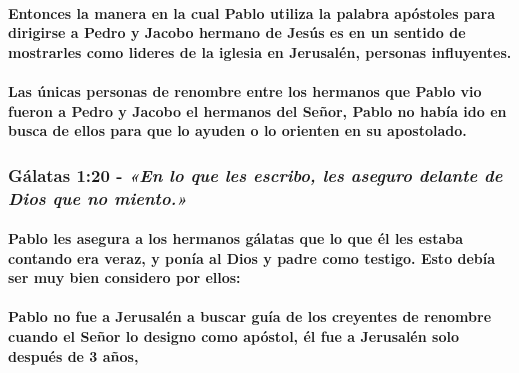 \documentclass[11a pt,twoside]{article}
\newcommand{\scripture}[1]{%
  {\fontsize{12pt}{16pt}\selectfont\ScriptureFont\itshape #1}%
}
\let\oldsubsubsection\subsubsection
\renewcommand{\subsubsection}{\needspace{4\baselineskip}\oldsubsubsection}
\let\oldparagraph\paragraph
\renewcommand{\paragraph}{\needspace{3\baselineskip}\oldparagraph}
\begin{document}
\paragraph{Entonces la manera en la cual Pablo utiliza la palabra
apóstoles para dirigirse a Pedro y Jacobo hermano de Jesús es en un
sentido de mostrarles como lideres de la iglesia en Jerusalén, personas
influyentes.}\label{entonces-la-manera-en-la-cual-pablo-utiliza-la-palabra-apuxf3stoles-para-dirigirse-a-pedro-y-jacobo-hermano-de-jesuxfas-es-en-un-sentido-de-mostrarles-como-lideres-de-la-iglesia-en-jerusaluxe9n-personas-influyentes.}

\paragraph{Las únicas personas de renombre entre los hermanos que Pablo
vio fueron a Pedro y Jacobo el hermanos del Señor, Pablo no había ido en
busca de ellos para que lo ayuden o lo orienten en su
apostolado.}\label{las-uxfanicas-personas-de-renombre-entre-los-hermanos-que-pablo-vio-fueron-a-pedro-y-jacobo-el-hermanos-del-seuxf1or-pablo-no-habuxeda-ido-en-busca-de-ellos-para-que-lo-ayuden-o-lo-orienten-en-su-apostolado.}

\subsubsection{\texorpdfstring{Gálatas 1:20 -
\scripture{«En lo que les escribo, les aseguro delante de Dios que no miento.»}}{Gálatas 1:20 - }}\label{guxe1latas-120---en-lo-que-les-escribo-les-aseguro-delante-de-dios-que-no-miento.}

\paragraph{Pablo les asegura a los hermanos gálatas que lo que él les
estaba contando era veraz, y ponía al Dios y padre como testigo. Esto
debía ser muy bien considero por
ellos:}\label{pablo-les-asegura-a-los-hermanos-guxe1latas-que-lo-que-uxe9l-les-estaba-contando-era-veraz-y-ponuxeda-al-dios-y-padre-como-testigo.-esto-debuxeda-ser-muy-bien-considero-por-ellos}

\paragraph{Pablo no fue a Jerusalén a buscar guía de los creyentes de
renombre cuando el Señor lo designo como apóstol, él fue a Jerusalén
solo después de 3
años,}\label{pablo-no-fue-a-jerusaluxe9n-a-buscar-guuxeda-de-los-creyentes-de-renombre-cuando-el-seuxf1or-lo-designo-como-apuxf3stol-uxe9l-fue-a-jerusaluxe9n-solo-despuuxe9s-de-3-auxf1os}
\end{document}
